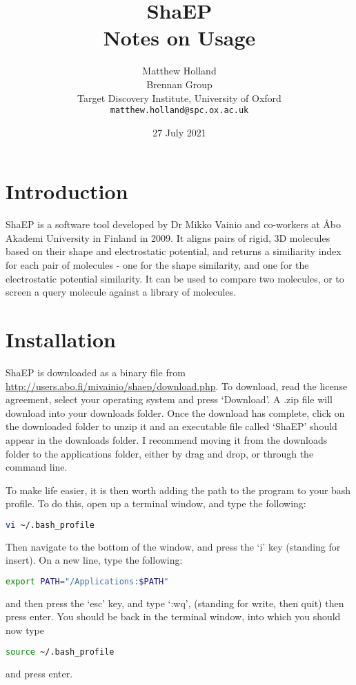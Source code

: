\documentclass[11pt]{article} %
\title{ShaEP \\ Notes on Usage}
\author{Matthew Holland \\ Brennan Group \\ Target Discovery Institute, University of Oxford \\ \texttt{matthew.holland@spc.ox.ac.uk}}
\date{27 July 2021} %
\begin{document}
\maketitle
\section{Introduction}
ShaEP is a software tool developed by Dr Mikko Vainio and co-workers at \AA bo Akademi University in Finland in 2009.\cite{vainio} It aligns pairs of rigid, 3D molecules based on their shape and electrostatic potential, and returns a similiarity index for each pair of molecules - one for the shape similarity, and one for the electrostatic potential similarity. It can be used to compare two molecules, or to screen a query molecule against a library of molecules.

\section{Installation}
ShaEP is downloaded as a binary file from \url{http://users.abo.fi/mivainio/shaep/download.php}. To download, read the license agreement, select your operating system and press `Download'. A .zip file will download into your downloads folder. Once the download has complete, click on the downloaded folder to unzip it and an executable file called `ShaEP' should appear in the downloads folder. I recommend moving it from the downloads folder to the applications folder, either by drag and drop, or through the command line.

To make life easier, it is then worth adding the path to the program to your bash profile. To do this, open up a terminal window, and type the following:


\begin{lstlisting}[language=bash]
vi ~/.bash_profile
\end{lstlisting}

Then navigate to the bottom of the window, and press the `i' key (standing for insert). On a new line, type the following:
\begin{lstlisting}[language=bash]
export PATH="/Applications:$PATH"
\end{lstlisting}
and then press the `esc' key, and type `:wq', (standing for write, then quit) then press enter. You should be back in the terminal window, into which you should now type
\begin{lstlisting}[language=bash]
source ~/.bash_profile
\end{lstlisting}
and press enter.
\end{document}

